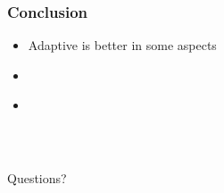 \documentclass[xcolor=svgnames]{beamer}
\begin{document}
\begin{frame}
	\frametitle{Conclusion}
  \begin{itemize}
    \item Adaptive is better in some aspects
    \item 
    \item 
    \
  \end{itemize}
\end{frame}
\begin{frame}
  \frametitle{~}
\begin{center} 
\huge  Questions?
\end{center}
\end{frame}
\end{document}
